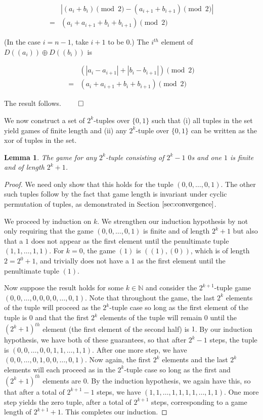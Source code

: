 \documentclass[12pt]{amsart}
\newtheorem{lemma}[theorem]{Lemma}
\newcommand{\xor}{\oplus}
\newcommand{\znn}{\mathbb{N}}
\begin{document}
$$\begin{array}{cl}
& |(a_i+b_i)\pmod{2} - (a_{i+1}+b_{i+1})\pmod{2}| \\
= & (a_i+a_{i+1}+b_i+b_{i+1})\pmod{2}
\end{array}$$

(In the case $i=n-1$, take $i+1$ to be $0$.) The $i^{th}$ element of $D((a_i))\xor D((b_i))$ is

$$\begin{array}{cl}
& (|a_i-a_{i+1}|+|b_i-b_{i+1}|)\pmod{2} \\
= & (a_i+a_{i+1}+b_i+b_{i+1})\pmod{2}
\end{array}$$

The result follows. $\qed$

We now construct a set of $2^k$-tuples over $\{0,1\}$ such that (i) all tuples in the set yield games of finite length and (ii) any $2^k$-tuple over $\{0,1\}$ can be written as the xor of tuples in the set.

\begin{lemma}
The game for any $2^k$-tuple consisting of $2^k-1$ $0$s and one $1$ is finite and of length $2^k+1$.
\end{lemma}

\begin{proof}
We need only show that this holds for the tuple $(0,0,\ldots,0,1)$. The other such tuples follow by the fact that game length is invariant under cyclic permutation of tuples, as demonstrated in Section $\ref{sec:convergence}$.

We proceed by induction on $k$. We strengthen our induction hypothesis by not only requiring that the game $(0,0,\ldots,0,1)$ is finite and of length $2^k+1$ but also that a $1$ does not appear as the first element until the penultimate tuple $(1,1,\ldots,1,1)$. For $k=0$, the game $(1)$ is $((1),(0))$, which is of length $2=2^0+1$, and trivially does not have a $1$ as the first element until the penultimate tuple $(1)$.

Now suppose the result holds for some $k\in \znn$ and consider the $2^{k+1}$-tuple game $(0,0,\ldots,0,0,0,0,\ldots,0,1)$. Note that throughout the game, the last $2^k$ elements of the tuple will proceed as the $2^k$-tuple case so long as the first element of the tuple is $0$ and that the first $2^k$ elements of the tuple will remain $0$ until the $(2^k+1)^{th}$ element (the first element of the second half) is $1$. By our induction hypothesis, we have both of these guarantees, so that after $2^k-1$ steps, the tuple is $(0,0,\ldots,0,0,1,1,\ldots,1,1)$. After one more step, we have $(0,0,\ldots,0,1,0,0,\ldots,0,1)$. Now again, the first $2^k$ elements and the last $2^k$ elements will each proceed as in the $2^k$-tuple case so long as the first and $(2^k+1)^{th}$ elements are $0$. By the induction hypothesis, we again have this, so that after a total of $2^{k+1}-1$ steps, we have $(1,1,\ldots,1,1,1,1,\ldots,1,1)$. One more step yields the zero tuple, after a total of $2^{k+1}$ steps, corresponding to a game length of $2^{k+1}+1$. This completes our induction.
\end{proof}
\end{document}
